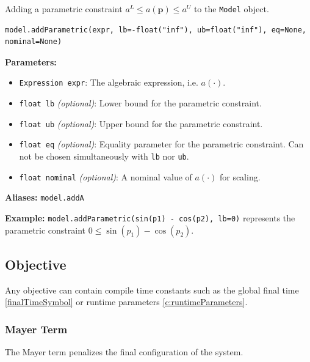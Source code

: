 \documentclass[12pt]{article}
\renewcommand{\v}{\bm}
\begin{document}
\begin{mdframed}[backgroundcolor=gray!10, roundcorner=10pt,
		linewidth=1pt]

	Adding a parametric constraint ${a}^{L} \leq {a}(\v{p}) \leq
		{a}^{U}$ to the \texttt{Model} object.

	\begin{lstlisting}
model.addParametric(expr, lb=-float("inf"), ub=float("inf"), eq=None, nominal=None)
		\end{lstlisting}
	\label{addParametric}
	\textbf{Parameters:}
	\begin{itemize}
		\item \texttt{Expression expr}: The algebraic
		      expression, i.e. $a(\cdot)$.
		\item \texttt{float lb} \emph{(optional)}: Lower bound
		      for the parametric constraint.
		\item \texttt{float ub} \emph{(optional)}: Upper bound
		      for the parametric constraint.
		\item \texttt{float eq} \emph{(optional)}: Equality
		      parameter for the parametric constraint. Can not be
		      chosen simultaneously with
		      \texttt{lb} nor \texttt{ub}.
		\item \texttt{float nominal} \emph{(optional)}: A
		      nominal value of $a(\cdot)$ for scaling.
	\end{itemize}

	\textbf{Aliases:}  \texttt{model.addA}

	\textbf{Example:} \texttt{model.addParametric(sin(p1) -
		cos(p2), lb=0)} represents the parametric constraint
	$0 \leq \sin(p_1) - \cos({p_2})$.
\end{mdframed}

\subsection{Objective}

Any objective can contain compile time constants such as the global
final time \ref{finalTimeSymbol} or runtime parameters
\ref{c:runtimeParameters}.

\subsubsection{Mayer Term}

The Mayer term penalizes the final configuration of the system.
\end{document}
